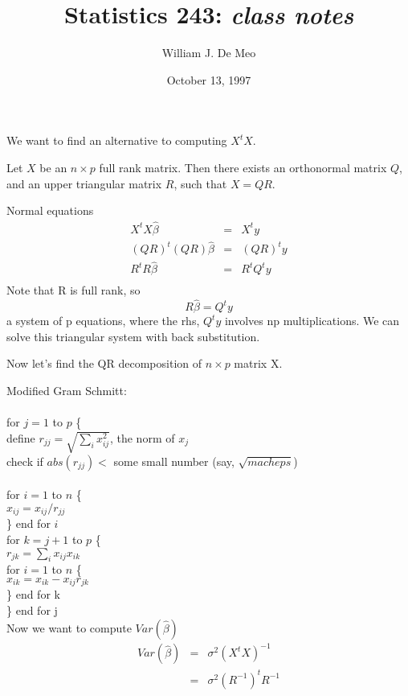 \documentclass{article}
\begin{document}
\title{Statistics 243: \emph{class notes}}
\author{William J. De Meo}
\date{October 13, 1997 }
\maketitle
We want to find an alternative to computing $X^tX$.

Let $X$ be an $n\times p$ full rank matrix.  Then there exists
an orthonormal matrix $Q$, and an upper triangular matrix $R$, such that
$X = QR$.

Normal equations 
\begin{eqnarray*}
X^tX \hat \beta & =& X^t y\\
(QR)^t(QR)\hat \beta &=& (QR)^t y\\
R^tR \hat \beta & = & R^t Q^t y\\
\end{eqnarray*}
Note that R is full rank, so
\[R\hat \beta = Q^t y\]
a system of p equations, where the rhs, $Q^t y$ involves np 
multiplications.  We can solve this triangular system with 
back substitution.

Now let's find the QR decomposition of $n \times p$ matrix X.

Modified Gram Schmitt:\\\\
for $j=1$ to $p$ \{\\
define $r_{jj} = \sqrt{\sum_i x_{ij}^2}$, the norm of $x_j$\\
check if $abs(r_{jj}) <$ some small number (say, $\sqrt{macheps}$)\\
\\
for $i=1$ to $n$ \{\\
\indent $x_{ij} = x_{ij}/r_{jj}$\\
\}
end for $i$\\
for $k=j+1$ to $p$ \{\\
\indent $r_{jk} = \sum_i x_{ij}x_{ik}$\\
\indent for $i=1$ to $n$ \{\\
\indent \hspace{1.5 cm}$x_{ik} = x_{ik} - x_{ij}r_{jk}$\\
\indent \} end for k\\
\} end for j\\

Now we want to compute $Var(\hat \beta)$
\begin{eqnarray*}
Var(\hat \beta)& =& \sigma^2(X^tX)^{-1}\\
& = & \sigma^2 (R^{-1})^tR^{-1}
\end{eqnarray*}
\end{document}
